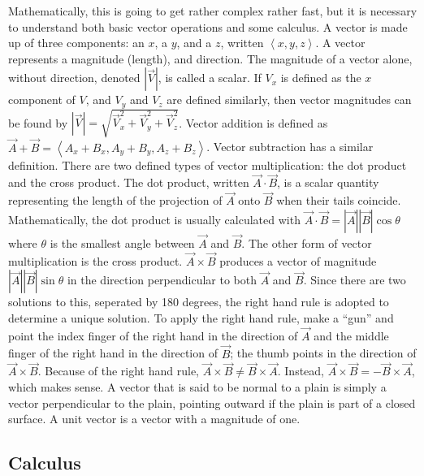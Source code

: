 \documentclass[12pt]{article}
\begin{document}
\indent Mathematically, this is going to get rather complex rather fast, but it is necessary to understand both basic vector operations and some calculus. A vector is made up of three components: an $x$, a $y$, and a $z$, written $\left\langle x,y,z\right\rangle$. A vector represents a magnitude (length), and direction. The magnitude of a vector alone, without direction, denoted $|\vec{V}|$, is called a scalar. If $V_x$ is defined as the $x$ component of $V$, and $V_y$ and $V_z$ are defined similarly, then vector magnitudes can be found by $|\vec{V}|=\sqrt{\vec{V}_x^2+\vec{V}_y^2+\vec{V}_z^2}$. Vector addition is defined as $\vec{A}+\vec{B}=\left\langle A_x+B_x,  A_y+B_y, A_z+B_z \right\rangle$. Vector subtraction has a similar definition. There are two defined types of vector multiplication: the dot product and the cross product. The dot product, written $\vec{A}\cdot \vec{B}$, is a scalar quantity representing the length of the projection of $\vec{A}$ onto $\vec{B}$ when their tails coincide. Mathematically, the dot product is usually calculated with $\vec{A}\cdot \vec{B}=|\vec{A}||\vec{B}|\cos{\theta}$ where $\theta$ is the smallest angle between $\vec{A}$ and $\vec{B}$. The other form of vector multiplication is the cross product. $\vec{A}\times \vec{B}$ produces a vector of magnitude $|\vec{A}||\vec{B}|\sin{\theta}$ in the direction perpendicular to both $\vec{A}$ and $\vec{B}$. Since there are two solutions to this, seperated by 180 degrees, the right hand rule is adopted to determine a unique solution. To apply the right hand rule, make a ``gun'' and point the index finger of the right hand in the direction of $\vec{A}$ and the middle finger of the right hand in the direction of $\vec{B}$; the thumb points in the direction of $\vec{A} \times \vec{B}$. Because of the right hand rule, $\vec{A} \times \vec{B} \neq \vec{B} \times \vec{A}$. Instead, $\vec{A} \times \vec{B} = -\vec{B} \times \vec{A}$, which makes sense. A vector that is said to be normal to a plain is simply a vector perpendicular to the plain, pointing outward if the plain is part of a closed surface. A unit vector is a vector with a magnitude of one.

\subsection{Calculus}
\end{document}
